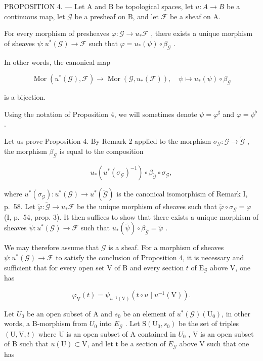 PROPOSITION 4. --- Let A and B be topological spaces, let \(u\colon A\to B\) be a continuous map, let \(\mathcal{G}\) be a presheaf on B, and let \(\mathcal{F}\) be a sheaf on A.

For every morphism of presheaves \(\varphi\colon\mathcal{G}\to u_{*}\mathcal{F}\) , there exists a unique morphism of sheaves \(\psi\colon u^{*}(\mathcal{G})\to\mathcal{F}\) such that \(\varphi=u_{*}(\psi)\circ\beta_{\mathcal{G}}\) .

In other words, the canonical map

\[
\operatorname{Mor} \left(u ^ {*} (\mathcal {G}), \mathcal {F}\right)\rightarrow \operatorname{Mor} \left(\mathcal {G}, u _ {*} (\mathcal {F})\right), \quad \psi \mapsto u _ {*} (\psi) \circ \beta_ {\mathcal {G}}
\]

is a bijection.

Using the notation of Proposition 4, we will sometimes denote \(\psi = \varphi^{\sharp}\) and \(\varphi = \psi^{\flat}\) .

Let us prove Proposition 4. By Remark 2 applied to the morphism \(\sigma_{\mathcal{G}}: \mathcal{G} \to \widetilde{\mathcal{G}}\) , the morphism \(\beta_{\mathcal{G}}\) is equal to the composition

\[
u _ {*} (u ^ {*} (\sigma_ {\mathcal {G}}) ^ {- 1}) \circ \beta_ {\widetilde {\mathcal {G}}} \circ \sigma_ {\mathcal {G}},
\]

where \(u^{*}(\sigma_{\mathcal{G}}) \colon u^{*}(\mathcal{G}) \to u^{*}(\widetilde{\mathcal{G}})\) is the canonical isomorphism of Remark I, p.~58. Let \(\widetilde{\varphi} \colon \widetilde{\mathcal{G}} \to u_{*}\mathcal{F}\) be the unique morphism of sheaves such that \(\widetilde{\varphi} \circ \sigma_{\mathcal{G}} = \varphi\) (I, p.~54, prop. 3). It then suffices to show that there exists a unique morphism of sheaves \(\widetilde{\psi} \colon u^{*}(\mathcal{G}) \to \mathcal{F}\) such that \(u_{*}(\widetilde{\psi}) \circ \beta_{\widetilde{\mathcal{G}}} = \widetilde{\varphi}\) .

We may therefore assume that \(\mathcal{G}\) is a sheaf. For a morphism of sheaves \(\psi: u^{*}(\mathcal{G}) \to \mathcal{F}\) to satisfy the conclusion of Proposition 4, it is necessary and sufficient that for every open set V of B and every section \(t\) of \(\mathrm{E}_{\mathcal{G}}\) above V, one has

\[
\varphi_{\mathrm{V}}(t) = \psi_{u^{-1}(\mathrm{V})}(t \circ u \mid u^{-1}(\mathrm{V})).\tag{6}
\]

Let \(U_{0}\) be an open subset of A and \(s_{0}\) be an element of \(u^{*}(\mathcal{G})(\mathrm{U}_{0})\), in other words, a B-morphism from \(U_{0}\) into \(E_{\mathcal{G}}\) . Let \(\mathrm{S}(\mathrm{U}_{0}, s_{0})\) be the set of triples \((\mathrm{U}, \mathrm{V}, t)\) where U is an open subset of A contained in \(U_{0}\) , V is an open subset of B such that \(u(\mathrm{U}) \subset \mathrm{V}\), and let t be a section of \(E_{\mathcal{G}}\) above V such that one has

